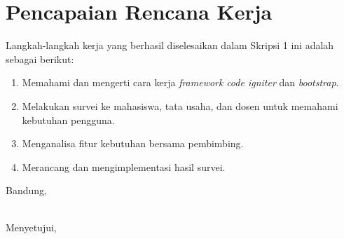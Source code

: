 \documentclass[a4paper,twoside]{article}
\begin{document}
\section{Pencapaian Rencana Kerja}
Langkah-langkah kerja yang berhasil diselesaikan dalam Skripsi 1 ini adalah sebagai berikut:
\begin{enumerate}
\item Memahami dan mengerti cara kerja \textit{framework} \textit{code igniter} dan \textit{bootstrap}.

\item Melakukan survei ke mahasiswa, tata usaha, dan dosen untuk memahami kebutuhan pengguna.

\item Menganalisa fitur kebutuhan bersama pembimbing.

\item Merancang dan mengimplementasi hasil survei.

\end{enumerate}




\vspace{1cm}
\centering Bandung, \tanggal\\
\vspace{2cm} \nama \\ 
\vspace{1cm}

Menyetujui, \\
\end{document}
